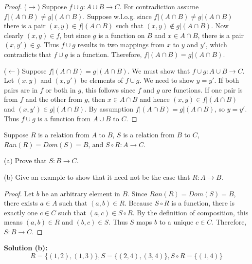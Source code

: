 \begin{proof}
    ($\rightarrow$) Suppose $f \cup g : A \cup B \rightarrow C$.
    For contradiction assume $f | (A \cap B) \ne g | (A \cap B)$.
    Suppose w.l.o.g. since $f | (A \cap B) \ne g | (A \cap B)$
        there is a pair $(x, y) \in f | (A \cap B)$
        such that $(x, y) \notin g | (A \cap B)$.
    Now clearly $(x, y) \in f$, but since $g$ is a function on $B$
        and $x \in A \cap B$, there is a pair $(x, y') \in g$.
    Thus $f \cup g$ results in two mappings from $x$ to $y$ and $y'$,
    which contradicts that $f \cup g$ is a function.
    Therefore, $f | (A \cap B) = g | (A \cap B)$.

    ($\leftarrow$) Suppose $f | (A \cap B) = g | (A \cap B)$.
    We must show that $f \cup g : A \cup B \rightarrow C$.
    Let $(x, y)$ and $(x, y')$ be elements of $f \cup g$.
    We need to show $y = y'$.
    If both pairs are in $f$ or both in $g$, this follows since
    $f$ and $g$ are functions.
    If one pair is from $f$ and the other from $g$, then
    $x \in A \cap B$ and hence $(x, y) \in f | (A \cap B)$
    and $(x, y') \in g | (A \cap B)$.
    By assumption $f | (A \cap B) = g | (A \cap B)$, so $y = y'$.
    Thus $f \cup g$ is a function from $A \cup B$ to $C$.
\end{proof}

\begin{tcolorbox}[title=Problem 13, breakable]
    Suppose $R$ is a relation from $A$ to $B$, $S$ is a relation 
    from $B$ to $C$, $Ran(R) = Dom(S) = B$, and $S \circ R : A \rightarrow C$.

    (a) Prove that $S : B \rightarrow C$.

    (b) Give an example to show that it need not be the case 
        that $R : A \rightarrow B$.
\end{tcolorbox}

\begin{proof}
    Let $b$ be an arbitrary element in $B$.
    Since $Ran(R) = Dom(S) = B$, there exists $a \in A$ such that $(a, b) \in R$.
    Because $S \circ R$ is a function, there is exactly one $c \in C$
        such that $(a, c) \in S \circ R$.
    By the definition of composition, this means $(a, b) \in R$ and $(b, c) \in S$.
    Thus $S$ maps $b$ to a unique $c \in C$.
    Therefore, $S : B \rightarrow C$.
\end{proof}

\textbf{Solution (b):}
\[R = \{(1, 2), (1, 3)\}, S = \{(2, 4), (3, 4)\}, S \circ R = \{(1, 4)\}\]

